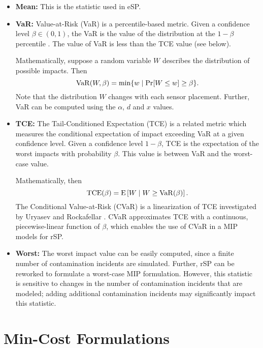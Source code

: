 \begin{itemize}
\item {\bfseries Mean:} This is the statistic used in eSP.


\item {\bfseries VaR:} Value-\/at-\/Risk (VaR) is a percentile-\/based metric. Given a confidence level $\beta\in(0,1)$, the VaR is the value of the distribution at the $1-\beta$ percentile \cite{TopVlaZen02}. The value of VaR is less than the TCE value (see below).

Mathematically, suppose a random variable $W$ describes the distribution of possible impacts. Then \[ {\rm VaR}(W,\beta) = \min \{ w \mid \Pr[W \le w] \ge \beta \}. \] Note that the distribution $W$ changes with each sensor placement. Further, VaR can be computed using the $\alpha$, $d$ and $x$ values.


\item {\bfseries TCE:} The Tail-\/Conditioned Expectation (TCE) is a related metric which measures the conditional expectation of impact exceeding VaR at a given confidence level. Given a confidence level $1-\beta$, TCE is the expectation of the worst impacts with probability $\beta$. This value is between VaR and the worst-\/case value.

Mathematically, then \[ {\rm TCE}(\beta) = {\rm E}\left[ W \mid W \ge {\rm VaR}(\beta) \right]. \] The Conditional Value-\/at-\/Risk (CVaR) is a linearization of TCE investigated by Uryasev and Rockafellar \cite{rockafellar02cvar}. CVaR approximates TCE with a continuous, piecewise-\/linear function of $\beta$, which enables the use of CVaR in a MIP models for rSP.


\item {\bfseries Worst:} The worst impact value can be easily computed, since a finite number of contamination incidents are simulated. Further, rSP can be reworked to formulate a worst-\/case MIP formulation. However, this statistic is sensitive to changes in the number of contamination incidents that are modeled; adding additional contamination incidents may significantly impact this statistic.


\end{itemize}

\section{Min-\/Cost Formulations}\label{formulations_formulationsMinCost}

